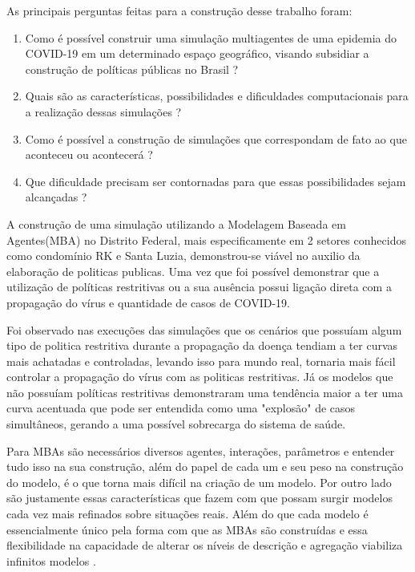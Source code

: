 As principais perguntas feitas para a construção desse trabalho foram:

\begin{enumerate}
\item Como é possível construir uma simulação multiagentes de uma epidemia do COVID-19 em um determinado espaço geográfico, visando subsidiar a construção de políticas públicas no Brasil ? 
\item Quais são as características, possibilidades e dificuldades computacionais para a realização dessas simulações ? 
\item Como é possível a construção de simulações que correspondam de fato ao que aconteceu ou acontecerá ?
\item Que dificuldade precisam ser contornadas para que essas possibilidades sejam alcançadas ?
\end{enumerate}


A construção de uma simulação utilizando a Modelagem Baseada em Agentes(MBA) no Distrito Federal, mais especificamente em 2 setores conhecidos como condomínio RK e Santa Luzia, demonstrou-se viável no auxilio da elaboração de politicas publicas. Uma vez que foi possível demonstrar que a utilização de políticas restritivas ou a sua ausência possui ligação direta com a propagação do vírus e quantidade de casos de COVID-19. 

Foi observado nas execuções das simulações que os cenários que possuíam algum tipo de politica restritiva durante a propagação da doença tendiam a ter curvas mais achatadas e controladas, levando isso para mundo real, tornaria mais fácil controlar a propagação do vírus com as politicas restritivas. Já os modelos que não possuíam políticas restritivas demonstraram uma tendência maior a ter uma curva acentuada que pode ser entendida como uma "explosão" de casos simultâneos, gerando a uma possível sobrecarga do sistema de saúde.    

Para MBAs são necessários diversos agentes, interações, parâmetros e entender tudo isso na sua construção, além do papel de cada um e seu peso na construção do modelo, é o que torna mais difícil na criação de um modelo. Por outro lado são justamente essas características que fazem com que possam surgir modelos cada vez mais refinados sobre situações reais. Além do que cada modelo é essencialmente único pela forma com que as MBAs são construídas e essa flexibilidade na capacidade de alterar os níveis de descrição e agregação viabiliza infinitos modelos \cite{bonabeau2002agent}.

